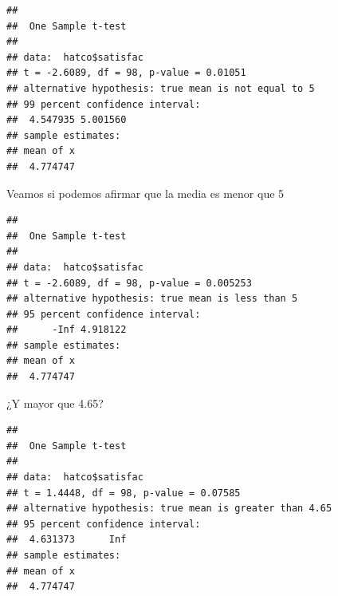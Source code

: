 \documentclass[]{book}
\newenvironment{Shaded}{\begin{snugshade}}{\end{snugshade}}
\newcommand{\KeywordTok}[1]{\textcolor[rgb]{0.13,0.29,0.53}{\textbf{#1}}}
\newcommand{\DataTypeTok}[1]{\textcolor[rgb]{0.13,0.29,0.53}{#1}}
\newcommand{\DecValTok}[1]{\textcolor[rgb]{0.00,0.00,0.81}{#1}}
\newcommand{\FloatTok}[1]{\textcolor[rgb]{0.00,0.00,0.81}{#1}}
\newcommand{\StringTok}[1]{\textcolor[rgb]{0.31,0.60,0.02}{#1}}
\newcommand{\OperatorTok}[1]{\textcolor[rgb]{0.81,0.36,0.00}{\textbf{#1}}}
\newcommand{\NormalTok}[1]{#1}
\begin{document}
\begin{Shaded}
\end{Shaded}

\begin{verbatim}
## 
##  One Sample t-test
## 
## data:  hatco$satisfac
## t = -2.6089, df = 98, p-value = 0.01051
## alternative hypothesis: true mean is not equal to 5
## 99 percent confidence interval:
##  4.547935 5.001560
## sample estimates:
## mean of x 
##  4.774747
\end{verbatim}

Veamos si podemos afirmar que la media es menor que 5

\begin{Shaded}
\end{Shaded}

\begin{verbatim}
## 
##  One Sample t-test
## 
## data:  hatco$satisfac
## t = -2.6089, df = 98, p-value = 0.005253
## alternative hypothesis: true mean is less than 5
## 95 percent confidence interval:
##      -Inf 4.918122
## sample estimates:
## mean of x 
##  4.774747
\end{verbatim}

¿Y mayor que 4.65?

\begin{Shaded}
\end{Shaded}

\begin{verbatim}
## 
##  One Sample t-test
## 
## data:  hatco$satisfac
## t = 1.4448, df = 98, p-value = 0.07585
## alternative hypothesis: true mean is greater than 4.65
## 95 percent confidence interval:
##  4.631373      Inf
## sample estimates:
## mean of x 
##  4.774747
\end{verbatim}
\end{document}
